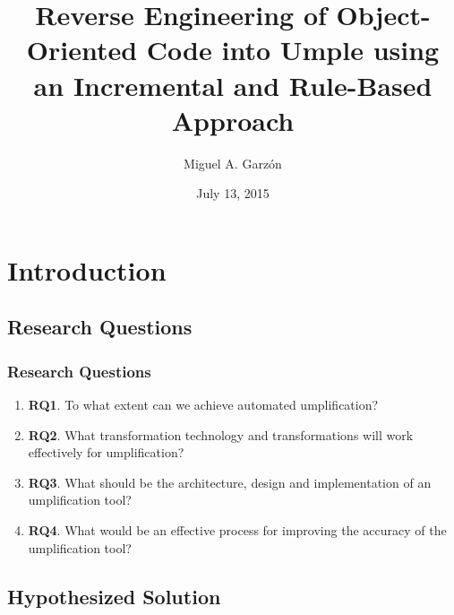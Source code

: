 \documentclass[xcolor=table]{beamer}
\title[Umplification]{Reverse Engineering of Object-Oriented Code into Umple using an Incremental and Rule-Based Approach}
\author{Miguel A. Garzón} %
\institute[uOttawa] %
{
Presented to the \textbf{Faculty of Graduate and} \newline \textbf{Postdoctoral Studies} in partial fulfillment of the \newline requirements for the degree Doctor of Philosophy (Computer Science)
}
\date{July 13, 2015} %
\begin{document}
\begin{frame}
\titlepage %
\end{frame}
\section{Introduction}

\subsection{Research Questions}
\begin{frame}
\frametitle{Research Questions}

\begin{enumerate}
\item \textbf{RQ1}. To what extent can we achieve automated umplification?
\item \textbf{RQ2}. What \textcolor{important}{transformation technology} and transformations  will work effectively for umplification?
\item \textbf{RQ3}. What should be the \textcolor{important}{architecture}, \textcolor{important}{design} and \textcolor{important}{implementation} of an umplification tool?
\item \textbf{RQ4}. What would be an effective process for \textcolor{important}{improving the accuracy} of the umplification tool?
\end{enumerate}
\end{frame}

\subsection{Hypothesized Solution}
\end{document}
